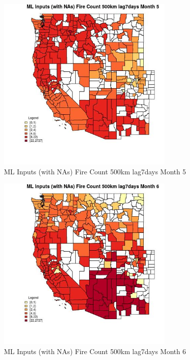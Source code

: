 \begin{figure} 
\centering  
\includegraphics[width=0.77\textwidth]{Code_Outputs/Report_ML_input_PM25_Step4_part_f_de_duplicated_aveswNAs_CountyFire_Count_500km_lag7daysmedianMonth5.jpg} 
\caption{\label{fig:Report_ML_input_PM25_Step4_part_f_de_duplicated_aveswNAsCountyFire_Count_500km_lag7daysmedianMonth5}ML Inputs (with NAs) Fire Count 500km lag7days Month 5} 
\end{figure} 
 

\begin{figure} 
\centering  
\includegraphics[width=0.77\textwidth]{Code_Outputs/Report_ML_input_PM25_Step4_part_f_de_duplicated_aveswNAs_CountyFire_Count_500km_lag7daysmedianMonth6.jpg} 
\caption{\label{fig:Report_ML_input_PM25_Step4_part_f_de_duplicated_aveswNAsCountyFire_Count_500km_lag7daysmedianMonth6}ML Inputs (with NAs) Fire Count 500km lag7days Month 6} 
\end{figure} 
 

